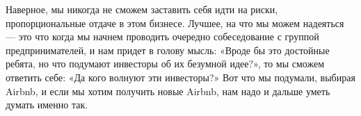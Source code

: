 \documentclass[ebook,12pt,oneside,openany]{memoir}
\begin{document}
Наверное, мы никогда не сможем заставить себя идти на риски,
пропорциональные отдаче в этом бизнесе. Лучшее, на что мы можем
надеяться — это что когда мы начнем проводить очередно собеседование с
группой предпринимателей, и нам придет в голову мысль: «Вроде бы это
достойные ребята, но что подумают инвесторы об их безумной идее?», то
мы сможем ответить себе: «Да кого волнуют эти инвесторы?» Вот что мы
подумали, выбирая Airbnb, и если мы хотим получить новые Airbnb, нам
надо и дальше уметь думать именно так.
\end{document}
